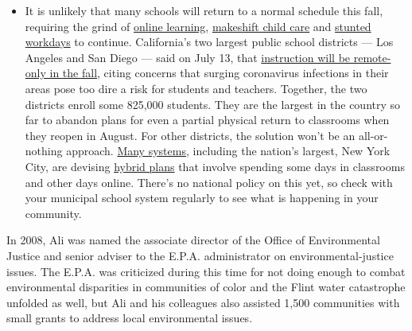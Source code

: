 \begin{itemize}
  \begin{itemize}
  \tightlist
  \item
    It is unlikely that many schools will return to a normal schedule
    this fall, requiring the grind of
    \href{https://www.nytimes.com/2020/06/05/us/coronavirus-education-lost-learning.html?action=click\&pgtype=Article\&state=default\&region=MAIN_CONTENT_3\&context=storylines_faq}{online
    learning},
    \href{https://www.nytimes.com/2020/05/29/us/coronavirus-child-care-centers.html?action=click\&pgtype=Article\&state=default\&region=MAIN_CONTENT_3\&context=storylines_faq}{makeshift
    child care} and
    \href{https://www.nytimes.com/2020/06/03/business/economy/coronavirus-working-women.html?action=click\&pgtype=Article\&state=default\&region=MAIN_CONTENT_3\&context=storylines_faq}{stunted
    workdays} to continue. California's two largest public school
    districts --- Los Angeles and San Diego --- said on July 13, that
    \href{https://www.nytimes.com/2020/07/13/us/lausd-san-diego-school-reopening.html?action=click\&pgtype=Article\&state=default\&region=MAIN_CONTENT_3\&context=storylines_faq}{instruction
    will be remote-only in the fall}, citing concerns that surging
    coronavirus infections in their areas pose too dire a risk for
    students and teachers. Together, the two districts enroll some
    825,000 students. They are the largest in the country so far to
    abandon plans for even a partial physical return to classrooms when
    they reopen in August. For other districts, the solution won't be an
    all-or-nothing approach.
    \href{https://bioethics.jhu.edu/research-and-outreach/projects/eschool-initiative/school-policy-tracker/}{Many
    systems}, including the nation's largest, New York City, are
    devising
    \href{https://www.nytimes.com/2020/06/26/us/coronavirus-schools-reopen-fall.html?action=click\&pgtype=Article\&state=default\&region=MAIN_CONTENT_3\&context=storylines_faq}{hybrid
    plans} that involve spending some days in classrooms and other days
    online. There's no national policy on this yet, so check with your
    municipal school system regularly to see what is happening in your
    community.
  \end{itemize}
\end{itemize}

In 2008, Ali was named the associate director of the Office of
Environmental Justice and senior adviser to the E.P.A. administrator on
environmental-justice issues. The E.P.A. was criticized during this time
for not doing enough to combat environmental disparities in communities
of color and the Flint water catastrophe unfolded as well, but Ali and
his colleagues also assisted 1,500 communities with small grants to
address local environmental issues.

